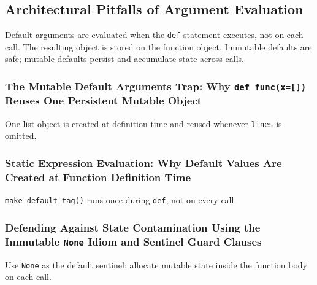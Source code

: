 \subsection{Architectural Pitfalls of Argument Evaluation}

Default arguments are evaluated when the \texttt{def} statement executes, not on each call. The resulting object is stored on the function object. Immutable defaults are safe; mutable defaults persist and accumulate state across calls.

\subsubsection{The Mutable Default Arguments Trap: Why \texttt{def func(x=[])} Reuses One Persistent Mutable Object}



One list object is created at definition time and reused whenever \texttt{lines} is omitted.

\subsubsection{Static Expression Evaluation: Why Default Values Are Created at Function Definition Time}



\texttt{make\_default\_tag()} runs once during \texttt{def}, not on every call.

\subsubsection{Defending Against State Contamination Using the Immutable \texttt{None} Idiom and Sentinel Guard Clauses}



Use \texttt{None} as the default sentinel; allocate mutable state inside the function body on each call.
